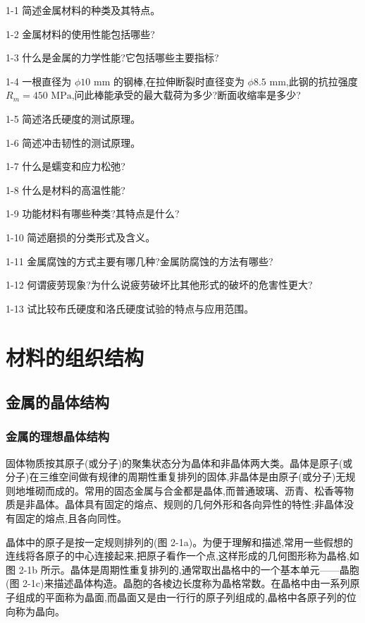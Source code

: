 \documentclass[UTF8]{ctexbook}
\newcommand{\◎}{\ensuremath{\bigcirc}}
\begin{document}
1-1 简述金属材料的种类及其特点。

1-2 金属材料的使用性能包括哪些?

1-3 什么是金属的力学性能?它包括哪些主要指标?

1-4 一根直径为 $\phi 10 \text{ mm}$ 的钢棒,在拉伸断裂时直径变为 $\phi 8.5 \text{ mm}$,此钢的抗拉强度 $R_m = 450 \text{ MPa}$,问此棒能承受的最大载荷为多少?断面收缩率是多少?

1-5 简述洛氏硬度的测试原理。

1-6 简述冲击韧性的测试原理。

1-7 什么是蠕变和应力松弛?

1-8 什么是材料的高温性能?

1-9 功能材料有哪些种类?其特点是什么?

1-10 简述磨损的分类形式及含义。

1-11 金属腐蚀的方式主要有哪几种?金属防腐蚀的方法有哪些?

1-12 何谓疲劳现象?为什么说疲劳破坏比其他形式的破坏的危害性更大?

1-13 试比较布氏硬度和洛氏硬度试验的特点与应用范围。


\chapter{材料的组织结构}

\section{金属的晶体结构}

\subsection{金属的理想晶体结构}

固体物质按其原子(或分子)的聚集状态分为晶体和非晶体两大类。晶体是原子(或分子)在三维空间做有规律的周期性重复排列的固体,非晶体是由原子(或分子)无规则地堆砌而成的。常用的固态金属与合金都是晶体,而普通玻璃、沥青、松香等物质是非晶体。晶体具有固定的熔点、规则的几何外形和各向异性的特性;非晶体没有固定的熔点,且各向同性。

晶体中的原子是按一定规则排列的(图 2-1a)。为便于理解和描述,常用一些假想的连线将各原子的中心连接起来,把原子看作一个点,这样形成的几何图形称为晶格,如图 2-1b 所示。晶体是周期性重复排列的,通常取出晶格中的一个基本单元——晶胞(图 2-1c)来描述晶体构造。晶胞的各棱边长度称为晶格常数。在晶格中由一系列原子组成的平面称为晶面,而晶面又是由一行行的原子列组成的,晶格中各原子列的位向称为晶向。
\end{document}
